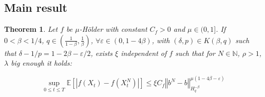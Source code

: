\documentclass[11pt]{enstaPRE}
\newtheorem{theo}{Theorem}
\newcommand{\norme}[1]{\left\Vert #1\right\Vert}
\newcommand{\N}{\mathbb{N}}
\newcommand{\E}{\mathbb{E}}
\begin{document}
\subsection{Main result}

\begin{theo}\label{main}
    Let $f$ be $\mu$-Hölder with constant $C_f>0$ and $\mu\in(0,1]$. If $0<\beta < 1/4$, $q\in\left(\frac{1}{1-\beta},\frac{1}{\beta}\right)$, $\forall \varepsilon \in(0,1-4\beta)$, with  $(\delta,p)\in K(\beta,q)$ such that $\delta - 1/p = 1-2\beta - \varepsilon/2$, exists $\xi$ independent of $f$ such that for $N\in\N$, $\rho>1$, $\lambda$ big enough it holds:
    
    \begin{equation*}
    \underset{0\leq t\leq T} {\sup}\E\left[\left|f\left(X_t\right)-f\left(X_t^N\right)\right|\right] \leq \xi C_f \norme{b^N-b}_{H^{-\beta}_{q}}^{\mu\left(1-4\beta-\varepsilon\right)}
    \end{equation*}
\end{theo}
\end{document}
